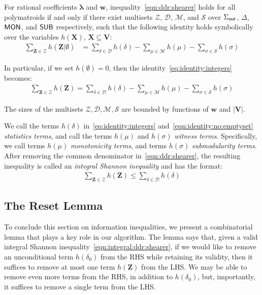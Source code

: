 \documentclass{theoretics}
\newcommand{\calM}{\mathcal M}
\newcommand{\calS}{\mathcal S}
\newcommand{\calD}{\mathcal D}
\newcommand{\calZ}{\mathcal Z}
\newcommand{\out}{\text{\sf out}}
\newcommand{\mon}{\text{\sf MON}}
\newcommand{\sub}{\text{\sf SUB}}
\begin{document}
\begin{corollary} \label{cor:integral:witness}
For rational coefficients $\bm\lambda$ and $\bm w$, inequality~\eqref{eqn:ddr:shearer} holds for all
polymatroids if and only if there exist multisets $\calZ$, $\calD$, $\calM$, and
$\calS$ over $\Sigma_{\out}$, $\Delta$, $\mon$, and $\sub$ respectively, such that the
following identity holds symbolically over the variables $h(\bm X)$, $\bm X \subseteq \bm
V$:
%
\begin{align}
  \sum_{\bm Z \in \calZ} h(\bm Z|\emptyset)
    &= \sum_{\delta \in \calD} h(\delta)
    - \sum_{\mu \in \calM} h(\mu)
    - \sum_{\sigma \in \calS} h(\sigma) \label{eq:identity:integers}
\end{align}

In particular, if we set $h(\emptyset) = 0$, then the identity~\eqref{eq:identity:integers} becomes:
\begin{align}
    \sum_{\bm Z \in \calZ} h(\bm Z)
      = \sum_{\delta \in \calD} h(\delta)
      - \sum_{\mu \in \calM} h(\mu)
      - \sum_{\sigma \in \calS} h(\sigma)
      \label{eqn:identity:no:emptyset}
\end{align}
\end{corollary}
The sizes of the multisets $\calZ, \calD, \calM, \calS$ are bounded by functions of
$\bm w$ and $|\bm V|$.


\begin{definition}
We call the terms $h(\delta)$ in~\eqref{eq:identity:integers} and~\eqref{eqn:identity:no:emptyset} {\em
statistics terms}, and call the terms $h(\mu)$ and
$h(\sigma)$ {\em witness terms}.
Specifically, we call terms $h(\mu)$ {\em monotonicity terms}, and terms $h(\sigma)$ {\em submodularity terms}.
After removing the common denominator in~\eqref{eqn:ddr:shearer}, the resulting inequality
is called an {\em integral Shannon inequality} and has the format:
\begin{align}
\sum_{\bm Z \in \calZ}h(\bm Z) \leq \sum_{\delta \in \calD} h(\delta)
\label{eqn:integral:ddr:shearer}
\end{align}
\end{definition}

\subsection{The Reset Lemma}
\label{subsec:reset}

To conclude this section on information inequalities, we present a combinatorial lemma that
plays a key role in our algorithm. The lemma says that, given a valid integral Shannon
inequality~\eqref{eqn:integral:ddr:shearer}, if we would like to remove an unconditional
term $h(\delta_{0})$ from the RHS while retaining its validity, then it suffices to remove
at most one term $h(\bm Z)$ from the LHS. We may be able to remove even more terms from the
RHS, in addition to $h(\delta_{0})$, but, importantly, it suffices to remove a single term
from the LHS.
\end{document}
